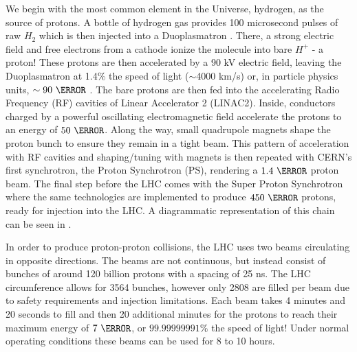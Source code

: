 We begin with the most common element in the Universe, hydrogen, as the source
of protons.  A bottle of hydrogen gas provides 100 microsecond pulses of raw
$H_{2}$ which is then injected into a Duoplasmatron \cite{Scrivens:1382102}.
There,  a strong electric field and free electrons from a cathode ionize the
molecule into bare $H^{+}$ - a proton!  These protons are then accelerated by
a 90 kV electric field, leaving the Duoplasmatron at 1.4\% the speed of light
($\sim$4000 km/s) or, in particle physics units, $\sim 90~\keV$
\cite{duoplasmatron_doc}. The bare protons are then fed into the accelerating
Radio Frequency (RF) cavities of Linear Accelerator 2 (LINAC2).  Inside,
conductors charged by a powerful oscillating electromagnetic field accelerate
the protons to an energy of $50~\MeV$. Along the way, small quadrupole magnets
shape the proton bunch to ensure they remain in a tight beam.  This pattern of
acceleration with RF cavities and shaping/tuning with magnets is then repeated
with CERN's first synchrotron, the Proton Synchrotron (PS), rendering a $1.4~\GeV$
proton beam.  The final step before the LHC comes with the Super Proton
Synchrotron where the same technologies are implemented to produce $450~\GeV$
protons, ready for injection into the LHC. A diagrammatic representation of
this chain can be seen in . 

In order to produce proton-proton collisions, the LHC uses two beams
circulating in opposite directions.  The beams are not continuous, but instead
consist of bunches of around 120 billion protons with a spacing of 25 ns.
The LHC circumference allows for 3564 bunches, however only 2808 are
filled per beam due to safety requirements and injection limitations.  Each
beam takes 4 minutes and 20 seconds to fill and then 20 additional minutes
for the protons to reach their maximum energy of $7~\TeV$, or
$99.99999991\%$ the speed of light! Under normal operating conditions these
beams can be used for 8 to 10 hours.
